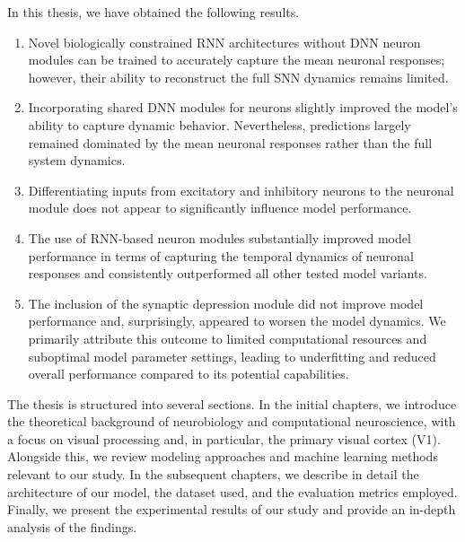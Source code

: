 In this thesis, we have obtained the following results. 
\begin{enumerate}
    \item Novel biologically constrained RNN architectures without DNN neuron modules can be trained to accurately capture the mean neuronal responses; however, their ability to reconstruct the full SNN dynamics remains limited. 
    \item Incorporating shared DNN modules for neurons slightly improved the model's ability to capture dynamic behavior. Nevertheless, predictions largely remained dominated by the mean neuronal responses rather than the full system dynamics. 
    \item Differentiating inputs from excitatory and inhibitory neurons to the neuronal module does not appear to significantly influence model performance.
    \item The use of RNN-based neuron modules substantially improved model performance in terms of capturing the temporal dynamics of neuronal responses and consistently outperformed all other tested model variants.
    \item The inclusion of the synaptic depression module did not improve model performance and, surprisingly, appeared to worsen the model dynamics. We primarily attribute this outcome to limited computational resources and suboptimal model parameter settings, leading to underfitting and reduced overall performance compared to its potential capabilities. 
\end{enumerate}

The thesis is structured into several sections. In the initial chapters, we introduce the theoretical background of neurobiology and computational neuroscience, with a focus on visual processing and, in particular, the primary visual cortex (V1). Alongside this, we review modeling approaches and machine learning methods relevant to our study. In the subsequent chapters, we describe in detail the architecture of our model, the dataset used, and the evaluation metrics employed. Finally, we present the experimental results of our study and provide an in-depth analysis of the findings.
